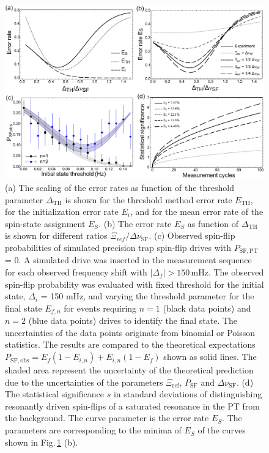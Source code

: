 \documentclass[preprint%
]{elsarticle}
\begin{document}
\begin{figure}[htb]
        \centerline{\includegraphics[width=0.95 \textwidth,keepaspectratio]{FIG5SSF.pdf}}
            \caption[Filter]{(a) The scaling of the error rates as function of the threshold parameter $\Delta_{\mathrm{TH}}$ is shown for the threshold method error rate $E_{\mathrm{TH}}$, for the initialization error rate $E_i$, and for the mean error rate of the spin-state assignment $E_S$. (b) The error rate $E_S$ as function of $\Delta_{\mathrm{TH}}$ is shown for different ratios $\Xi_{ref}/\Delta\nu_{\mathrm{SF}}$. (c) Observed spin-flip probabilities of simulated precision trap spin-flip drives with $P_{\mathrm{SF,PT}}$ = 0. A simulated drive was inserted in the measurement sequence for each observed frequency shift with $|\Delta_f| > 150\,$mHz. The observed spin-flip probability was evaluated with fixed threshold for the initial state, $\Delta_i$ = 150 mHz, and varying the threshold parameter for the final state $E_{f,n}$ for events requiring $n=1$ (black data points) and $n=2$ (blue data points) drives to identify the final state. The uncertainties of the data points originate from binomial or Poisson statistics. The results are compared to the theoretical expectations $P_{\mathrm{SF,obs}}=E_f (1-E_{i,n})+E_{i,n} (1-E_f)$ shown as solid lines. The shaded area represent the uncertainty of the theoretical prediction due to the uncertainties of the parameters $\Xi_{\mathrm{ref}}$, $P_{\mathrm{SF}}$ and $\Delta\nu_{\mathrm{SF}}$. (d) The statistical significance $s$ in standard deviations of distinguishing resonantly driven spin-flips of a saturated resonance in the PT from the background. The curve parameter is the error rate $E_S$. The parameters are corresponding to the minima of $E_S$ of the curves shown in Fig.$\,$\ref{fig3} (b). } 
						\label{fig3}
    \end{figure}
\end{document}
